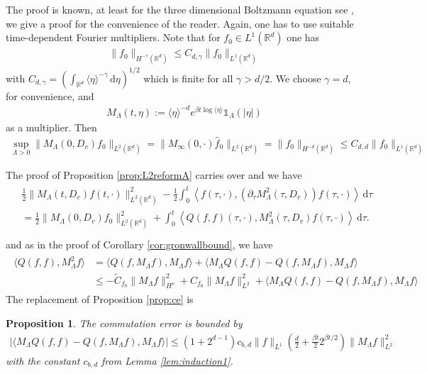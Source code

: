 \documentclass[11pt,a4paper,reqno]{amsart}
\theoremstyle{plain}
\newtheorem{proposition}{Proposition}[section]
\theoremstyle{definition}
\begin{document}
The proof is known, at least for the three dimensional Boltzmann equation see  \cite{MUXY09}, we give a proof for the convenience of the reader.  Again, one has to use suitable time-dependent Fourier multipliers.
Note that for $f_0\in L^1({\mathbb{R}}^d)$ one has
	\begin{align*}
		\|f_0\|_{H^{-\gamma}({\mathbb{R}}^d)} \le C_{d,\gamma} \|f_0\|_{L^1({\mathbb{R}}^d)}
	\end{align*}
	with $C_{d,\gamma}= \left(\int_{{\mathbb{R}}^d}\langle \eta \rangle^{-\gamma}\,
						\mathrm{d}\eta \right)^{1/2}$
	which is finite for all $\gamma>d/2$. We choose $\gamma = d$, for convenience, and
	\begin{align*}
		M_\Lambda(t,\eta):= \langle \eta \rangle ^{-d} e^{\beta t\log\langle\eta\rangle} {\mathds{1}}_\Lambda(|\eta|)
	\end{align*}
	as a multiplier. Then
	\begin{align*}
		\sup_{\Lambda > 0} \| M_\Lambda(0,D_v) f_0 \|_{L^2({\mathbb{R}}^d)}
			= \| M_\infty(0,\cdot) \hat{f}_0\|_{L^2({\mathbb{R}}^d)}
			= \|f_0\|_{H^{-d}({\mathbb{R}}^d)}
			\le C_{d,d} \| f_0 \|_{L^1({\mathbb{R}}^d)} 	
	\end{align*}
	
The proof of Proposition \ref{prop:L2reformA} carries over and we have
\begin{align}
	\begin{split}\label{eq:Hinfty1}
	&\frac{1}{2} \|M_{\Lambda}(t,D_v)f(t,\cdot)\|_{L^2({\mathbb{R}}^d)}^2 - \frac{1}{2} \int_0^t \left\langle f(\tau, \cdot), \left( \partial_\tau M_{\Lambda}^2(\tau, D_v) \right) f(\tau,\cdot)\right\rangle \,\mathrm{d}\tau \\
	&= \frac{1}{2} \|M_\Lambda(0,D_v)f_0\|_{L^2({\mathbb{R}}^d)}^2 + \int_0^t \left\langle Q(f,f)(\tau, \cdot), M_{\Lambda}^2(\tau, D_v)f(\tau, \cdot)\right\rangle \, \mathrm{d}\tau. \\
	\end{split}
\end{align}
and as in the proof of Corollary \ref{cor:gronwallbound}, we have
\begin{align}
\begin{split}\label{eq:Hinfty2}
	\langle Q(f,f), M_{\Lambda}^2f \rangle
	&=
	\langle Q(f,M_\Lambda f), M_{\Lambda}f \rangle
	+
	\langle M_\Lambda Q(f,f) - Q(f,M_\Lambda f), M_{\Lambda}f \rangle \\
	&\leq - \widetilde{C}_{f_0} \|M_{\Lambda}f\|_{H^{\nu}}^2
		+ C_{f_0} \|M_{\Lambda}f\|_{L^2}^2
		+ \langle M_{\Lambda}Q(f,f) - Q(f,M_{\Lambda}f), M_{\Lambda}f\rangle
\end{split}
\end{align}
The replacement of Proposition \ref{prop:ce} is
\begin{proposition}\label{prop:Hinftyce}
	The commutation error is bounded by
	\begin{align}\label{eq:ce-polynomial}
		\left|\langle  M_{\Lambda}Q(f,f) - Q(f,M_{\Lambda}f), M_{\Lambda}f\rangle\right|
		\leq  (1+2^{d-1})c_{b,d} \|f\|_{L^1}\left(\frac{d}{2} + \frac{\beta t}{2}2^{\beta t/2} \right) \|M_{\Lambda} f\|_{L^2}^2
	\end{align}	
	with the constant $c_{b,d}$ from Lemma \ref{lem:induction1}.
\end{proposition}
\end{document}
